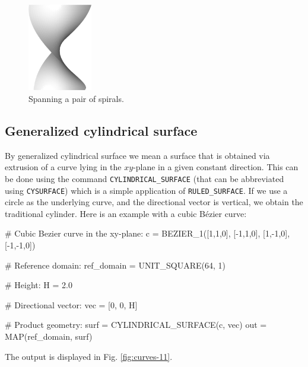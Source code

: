 \begin{figure}[!ht]
\begin{center}
\includegraphics[width=0.25\textwidth]{img/curves-10b.png}
\end{center}
\vspace{-4mm}
\caption{Spanning a pair of spirals.}
\label{fig:curves-10b}
\vspace{-1cm}
\end{figure}
\noindent

\subsection{Generalized cylindrical surface}

By generalized cylindrical surface we mean a surface that is obtained
via extrusion of a curve lying in the $xy$-plane in a given constant 
direction. This can be done using the command {\tt CYLINDRICAL\_SURFACE}
(that can be abbreviated using {\tt CYSURFACE})
which is a simple application of {\tt RULED\_SURFACE}. If we use 
a circle as the underlying curve, and the directional vector is vertical,
we obtain the traditional cylinder. 
Here is an example with a cubic B\'ezier curve:

\begin{bluecode}
# Cubic Bezier curve in the xy-plane:
c = BEZIER_1([1,1,0], [-1,1,0], [1,-1,0], [-1,-1,0])

# Reference domain:
ref_domain = UNIT_SQUARE(64, 1)

# Height:
H = 2.0

# Directional vector:
vec = [0, 0, H]

# Product geometry:
surf = CYLINDRICAL_SURFACE(c, vec)
out = MAP(ref_domain, surf)
\end{bluecode}
The output is displayed in Fig. \ref{fig:curves-11}.\\

